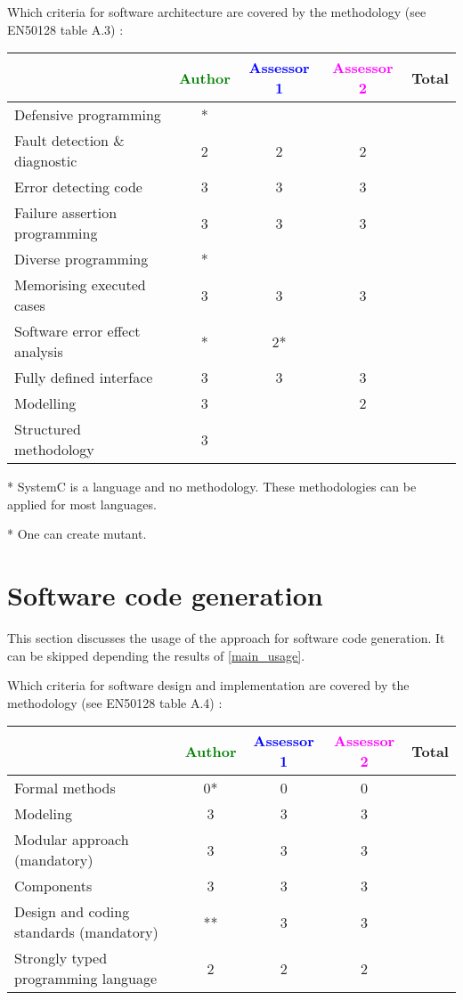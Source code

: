 \begin{assesor1}
Which criteria for software architecture are covered by the methodology
(see EN50128 table A.3) :

\begin{tabular}{|l | c | c | c | c|}
\hline
& \textcolor{green}{Author} & \textcolor{blue}{Assessor 1} & \textcolor{magenta}{Assessor 2} & Total \\
\hline
Defensive programming &* & & & \\
\hline
Fault detection \& diagnostic &2 &2 &2 & \\
\hline
Error detecting code &3 &3 &3 & \\
\hline
Failure assertion programming &3 &3 &3 & \\
\hline
Diverse programming &* & & & \\
\hline
Memorising executed cases &3 &3 &3 & \\
\hline
Software error effect analysis &* &2* & & \\
\hline
Fully defined interface &3 &3 &3 & \\
\hline
Modelling &3 & &2 & \\
\hline
Structured methodology &3 & & & \\
\hline
\end{tabular}

\begin{author_comment}
 * SystemC is a language and no methodology. These methodologies can be applied for most languages.
\end{author_comment}
\begin{assessor1}
* One can create mutant.
\end{assessor1}

\section{Software code generation}
This section discusses the usage of the approach for software code generation.
It can be skipped depending the results of \ref{main_usage}.

Which criteria for software design and implementation are covered by the methodology
(see EN50128 table A.4) :

\begin{tabular}{|l | c | c | c | c|}
\hline
& \textcolor{green}{Author} & \textcolor{blue}{Assessor 1} & \textcolor{magenta}{Assessor 2} & Total \\
\hline
Formal methods &0* &0 &0 & \\
\hline
Modeling &3 &3 &3 & \\
\hline
Modular approach (mandatory) &3 &3 &3 & \\
\hline
Components &3 &3 &3 & \\
\hline
Design and coding standards (mandatory) &** &3 &3 & \\
\hline
Strongly typed programming language &2 &2 &2 & \\
\hline


\end{tabular}
\end{assesor1}
